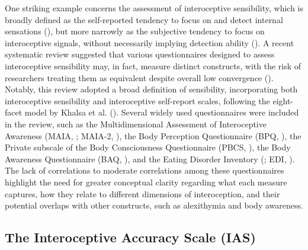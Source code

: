 \documentclass[
  jou,
  floatsintext,
  longtable,
  nolmodern,
  notxfonts,
  notimes,
  colorlinks=true,linkcolor=blue,citecolor=blue,urlcolor=blue]{apa7}
\begin{document}
One striking example concerns the assessment of interoceptive
sensibility, which is broadly defined as the self-reported tendency to
focus on and detect internal sensations
(), but more
narrowly as the subjective tendency to focus on interoceptive signals,
without necessarily implying detection ability
(). A recent
systematic review suggested that various questionnaires designed to
assess interoceptive sensibility may, in fact, measure distinct
constructs, with the risk of researchers treating them as equivalent
despite overall low convergence
(). Notably,
this review adopted a broad definition of sensibility, incorporating
both interoceptive sensibility and interoceptive self-report scales,
following the eight-facet model by Khalsa et al.
(). Several widely used
questionnaires were included in the review, such as the Multidimensional
Assessment of Interoceptive Awareness (MAIA,
; MAIA-2,
), the
Body Perception Questionnaire (BPQ,
), the Private subscale of
the Body Consciousness Questionnaire (PBCS,
), the Body
Awareness Questionnaire (BAQ, ), and the Eating Disorder Inventory
(; EDI,
). The lack of correlations
to moderate correlations among these questionnaires highlight the need
for greater conceptual clarity regarding what each measure captures, how
they relate to different dimensions of interoception, and their
potential overlaps with other constructs, such as alexithymia and body
awareness.

\subsection{The Interoceptive Accuracy Scale
(IAS)}\label{the-interoceptive-accuracy-scale-ias}
\end{document}
